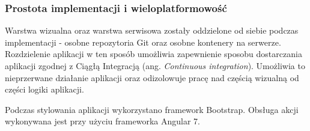 \subsubsection{Prostota implementacji i wieloplatformowość}
Warstwa wizualna oraz warstwa serwisowa zostały oddzielone od siebie podczas implementacji - osobne repozytoria Git oraz osobne kontenery na serwerze. Rozdzielenie aplikacji w ten sposób umożliwia zapewnienie sposobu dostarczania aplikacji zgodnej z Ciągłą Integracją (ang. \textit{Continuous integration}). Umożliwia to nieprzerwane działanie aplikacji oraz odizolowuje pracę nad częścią wizualną od części logiki aplikacji. 

Podczas stylowania aplikacji wykorzystano framework Bootstrap. Obsługa akcji wykonywana jest przy użyciu frameworka Angular 7.